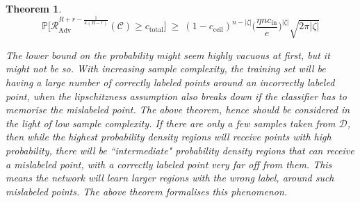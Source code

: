 \documentclass{ociamthesis}
\newtheorem{theorem}{Theorem}
\begin{document}
\begin{theorem}
    \begin{equation*}
        \mathbb{P} \biggl [
        \mathcal{R}_{\text{Adv}}^{R+r-\frac{1}{\kappa(R-r)}}
        (\mathcal{C}) \geq
        c_{\text{total}} 
        \biggr ]
        ~ \geq ~
        (1-c_{\text{ceil}})^{n-|\zeta|}
        \biggl (
            \frac{\eta n c_{\text{in}}}{e}
        \biggr )^{|\zeta|}
        \sqrt{2 \pi |\zeta|}
    \end{equation*}

    The lower bound on the probability might seem highly vacuous at first, but
    it might not be so. With increasing sample complexity, the training set will
    be having a large number of correctly labeled points around an incorrectly
    labeled point, when the lipschitzness assumption also breaks down if the
    classifier has to memorise the mislabeled point. The above theorem, hence
    should be considered in the light of low sample complexity. If there are
    only a few samples taken from $\mathcal{D}$, then while the highest
    probability density regions will receive points with high probability, there
    will be ``intermediate" probability density regions that can receive a
    mislabeled point, with a correctly labeled point very far off from them.
    This means the network will learn larger regions with the wrong label,
    around such mislabeled points. The above theorem formalises this phenomenon.
\end{theorem}
\end{document}
